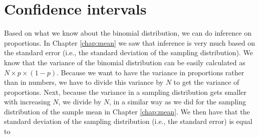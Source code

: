 \begin{knitrout}
\color{fgcolor}\begin{kframe}


{\ttfamily\noindent\bfseries{}}\end{kframe}
\end{knitrout}


\bigskip



\noindent{}


\bigskip



\section{Confidence intervals}

Based on what we know about the binomial distribution, we can do inference on proportions. In Chapter \ref{chap:mean} we saw that inference is very much based on the standard error (i.e., the standard deviation of the sampling distribution). We know that the variance of the binomial distribution can be easily calculated as $N \times p \times (1-p)$. Because we want to have the variance in proportions rather than in numbers, we have to divide this variance by $N$ to get the variance of proportions. Next, because the variance in a sampling distribution gets smaller with increasing $N$, we divide by $N$, in a similar way as we did for the sampling distribution of the sample mean in Chapter \ref{chap:mean}. We then have that the standard deviation of the sampling distribution (i.e., the standard error) is equal to 


